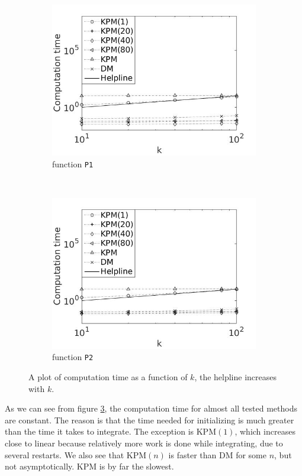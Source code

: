 \begin{figure}[H]
        \centering
        \begin{subfigure}[b]{0.45\textwidth}
                \includegraphics[width=\textwidth]{fig/n7timevsk1}
                \caption{function \texttt{P1}}
                \label{fig:timek1}
        \end{subfigure}%
~
        \begin{subfigure}[b]{0.45\textwidth}
                \includegraphics[width=\textwidth]{fig/n8timevsk2}
                \caption{function \texttt{P2}}
                \label{fig:timek2}
        \end{subfigure}
        \caption{A plot of computation time as a function of $k$, the helpline increases with $k$.}\label{fig:timek}
\end{figure}
As we can see from figure \ref{fig:timek}, the computation time for almost all tested methods are constant. The reason is that the time needed for initializing is much greater than the time it takes to integrate. 
The exception is KPM$(1)$, which increases close to linear because relatively more work is done while integrating, due to several restarts. 
We also see that KPM$(n)$ is faster than DM for some $n$, but not asymptotically. KPM is by far the slowest.

